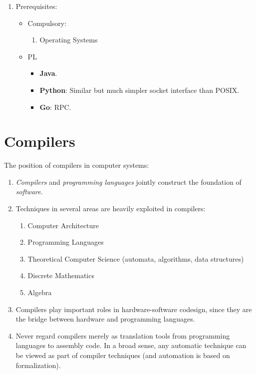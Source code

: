 \documentclass{article}
\begin{document}
\begin{enumerate}
    \item Prerequisites:
    \begin{itemize}
        \item Compulsory:
            \begin{enumerate}
            \item Operating Systems
            \end{enumerate}
        \item PL
        \begin{itemize}
            \item \textbf{Java}.
            \item \textbf{Python}: Similar but much simpler socket interface than POSIX.
            \item \textbf{Go}: RPC.
        \end{itemize}
    \end{itemize}
\end{enumerate}

\section{Compilers}

The position of compilers in computer systems:
\begin{enumerate}
    \item \emph{Compilers} and \emph{programming languages} jointly construct the foundation of \emph{software}.
    \item Techniques in several areas are heavily exploited in compilers:
    \begin{enumerate}
        \item Computer Architecture
        \item Programming Languages
        \item Theoretical Computer Science (automata, algorithms, data structures)
        \item Discrete Mathematics
        \item Algebra
    \end{enumerate}
    \item Compilers play important roles in hardware-software codesign, since they are the bridge between hardware and programming languages.
    \item Never regard compilers merely as translation tools from programming languages to assembly code. In a broad sense, any automatic technique can be viewed as part of compiler techniques (and automation is based on formalization).
\end{enumerate}
\end{document}
